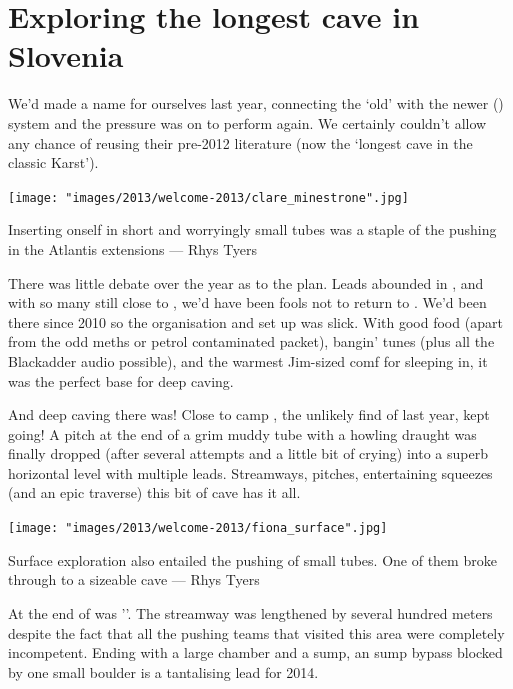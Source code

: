 
\section{Exploring the longest cave in Slovenia}

We’d made a name for ourselves last year, connecting the ‘old’  with the newer  () system and the pressure was on to perform again. We certainly couldn’t allow  any chance of reusing their pre-2012 literature (now the ‘longest cave in the classic Karst’). 

\begin{marginfigure}
\texttt{[image: "images/2013/welcome-2013/clare\_minestrone".jpg]}
\caption{Inserting onself in short and worryingly small tubes was a staple of the pushing in the Atlantis extensions --- Rhys Tyers}
\label{clare_minestrone}
\end{marginfigure}



There was little debate over the year as to the plan. Leads abounded in , and with so many still close to , we’d have been fools not to return to . We’d been there since 2010 so the organisation and set up was slick. With good food (apart from the odd meths or petrol contaminated packet), bangin’ tunes (plus all the Blackadder audio possible), and the warmest Jim-sized comf for sleeping in, it was the perfect base for deep caving.

And deep caving there was! Close to camp , the unlikely find of last year, kept going! A pitch at the end of a grim muddy tube with a howling draught was finally dropped (after several attempts and a little bit of crying) into a superb horizontal level with multiple leads. Streamways, pitches, entertaining squeezes (and an epic traverse) this bit of cave has it all.

\begin{marginfigure}
\texttt{[image: "images/2013/welcome-2013/fiona\_surface".jpg]}
\caption{Surface exploration also entailed the pushing of small tubes. One of them broke through to a sizeable cave --- Rhys Tyers}
\label{fiona_surface}
\end{marginfigure}

At the end of  was ''. The streamway was lengthened by several hundred meters despite the fact that all the pushing teams that visited this area were completely incompetent. Ending with a large chamber and a sump, an sump bypass blocked by one small boulder is a tantalising lead for 2014.

